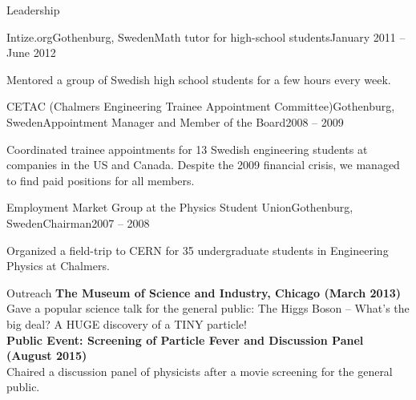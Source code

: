 \documentclass{resume}
\begin{document}
\begin{rsection}{Leadership}

  \begin{rsubsection}{Intize.org}{Gothenburg, Sweden}{Math tutor for high-school students}{January 2011 -- June 2012}
  \item Mentored a group of Swedish high school students for a few hours every week.  
  \end{rsubsection}


  \begin{rsubsection}{CETAC (Chalmers Engineering Trainee Appointment Committee)}{Gothenburg, Sweden}{Appointment Manager and Member of the Board}{2008 -- 2009}
	\item Coordinated trainee appointments for 13 Swedish engineering students at companies in the US and Canada. Despite the 2009 financial crisis, we managed to find paid positions for all members. 
  \end{rsubsection}


  \begin{rsubsection}{Employment Market Group at the Physics Student Union}{Gothenburg, Sweden}{Chairman}{2007 -- 2008}
		\item Organized a field-trip to CERN for 35 undergraduate students in Engineering Physics at Chalmers.
  \end{rsubsection}

\end{rsection}


\begin{rsection}{Outreach}
  \textbf{The Museum of Science and Industry, Chicago (March 2013)}\\
  Gave a popular science talk for the general public: The Higgs Boson -- What's the big deal? A HUGE discovery of a TINY particle!\\[0.1cm]
  \textbf{Public Event: Screening of Particle Fever and Discussion Panel (August 2015)}\\
  Chaired a discussion panel of physicists after a movie screening for the general public.
\end{rsection}
\end{document}
